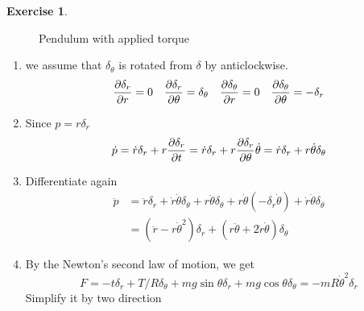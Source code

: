 \documentclass[11pt,a4paper]{report}
\theoremstyle{definition}\newtheorem{exercise}{Exercise}[chapter]
\begin{document}
\begin{exercise}
\begin{figure}[htbp]
        \caption{Pendulum with applied torque}
        \label{fig:exer1-3}
        \end{figure}
\end{exercise}

\begin{answer}
\begin{enumerate}[label=(\alph*)]
    \item we assume that $\delta_\theta$ is rotated from $\delta$ by anticlockwise.
    \begin{equation}
        \pdv{\delta_r}{r}=0 \quad
        \pdv{\delta_r}{\theta}=\delta_\theta \quad
        \pdv{\delta_\theta}{r}=0 \quad
        \pdv{\delta_\theta}{\theta}=-\delta_r
    \end{equation} 
    \item Since $p=r\delta_r$
    \begin{equation}
        \dot p=\dot r\delta_r+r\pdv{\delta_r}{t}
        =\dot r\delta_r+r\pdv{\delta_r}{\theta}\dot\theta
        =\dot r\delta_r+r\dot\theta\delta_\theta
    \end{equation}
    \item Differentiate again
    \begin{align}
        \ddot p&=\ddot r \delta_r+\dot r\dot\theta\delta_\theta+r\ddot\theta\delta_\theta+r\dot\theta\left(-\delta_r\dot\theta\right)+\dot r\dot\theta\delta_\theta\\
        &=\left(\ddot r-r\dot\theta^2\right)\delta_r+\left(r\ddot\theta+2\dot r\dot\theta\right)\delta_\theta
    \end{align}
    \item By the Newton's second law of motion, we get
    \begin{equation}
        F=-t\delta_r+T/R \delta_\theta+mg\sin\theta\delta_r+mg\cos\theta\delta_\theta=-mR\dot\theta^2\delta_r
    \end{equation}
    Simplify it by two direction

\end{enumerate}
\end{answer}
\end{document}
